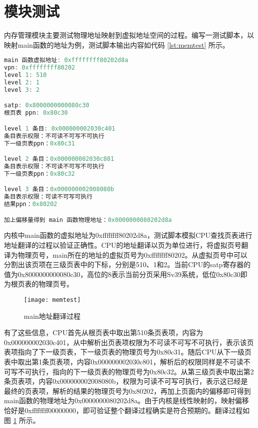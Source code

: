 \section{模块测试}

内存管理模块主要测试物理地址映射到虚拟地址空间的过程。编写一测试脚本，以映射main函数的地址为例，测试脚本输出内容如代码 \ref{lst:memtest} 所示。

\begin{minipage}[c]{0.95\textwidth}
\begin{lstlisting}[language={C}, caption={main函数地址翻译}, label={lst:memtest}]
main 函数虚拟地址: 0xffffffff80202d8a
vpn: 0xffffffff80202
level 1: 510
level 2: 1
level 3: 2

satp: 0x8000000000080c30
根页表 ppn: 0x80c30

level 1 条目: 0x000000002030c401
条目表示权限：不可读不可写不可执行
下一级页表ppn：0x80c31

level 2 条目：0x000000002030c801
条目表示权限：不可读不可写不可执行
下一级页表ppn：0x80c32

level 3 条目：0x000000002008080b
条目表示权限：可读不可写可执行
结果ppn：0x80202

加上偏移量得到 main 函数物理地址：0x0000000080202d8a
\end{lstlisting}
\end{minipage}

内核中main函数的虚拟地址为0xffffffff80202d8a，测试脚本模拟CPU查找页表进行地址翻译的过程以验证正确性。CPU的地址翻译以页为单位进行，将虚拟页号翻译为物理页号，main所在的地址的虚拟页号为0xffffffff80202。从虚拟页号中可以分割出该页项在三级页表中的下标，分别是510、1和2。当前CPU的satp寄存器的值为0x8000000000080c30，高位的8表示当前分页采用Sv39系统，低位0x80c30即为根页表的物理页号。

\begin{figure}[htpb]
	\centering
	\texttt{[image: memtest]}
	\setlength{\abovecaptionskip}{2pt}
	\caption{main地址翻译过程}
	\label{pic:memtest}
\end{figure}

有了这些信息，CPU首先从根页表中取出第510条页表项，内容为0x000000002030c401，从中解析出页表项权限为不可读不可写不可执行，表示该页表项指向了下一级页表，下一级页表的物理页号为0x80c31。随后CPU从下一级页表中取出第1条页表项，内容0x000000002030c801，解析后的权限同样是不可读不可写不可执行，指向的下一级页表的物理页号为0x80c32。从第三级页表中取出第2条页表项，内容0x000000002008080b，权限为可读不可写可执行，表示这已经是最终的页表项，解析的结果的物理页号为0x80202，再加上页面内的偏移即可得到main函数的物理地址为0x0000000080202d8a。由于内核是线性映射的，映射偏移恰好是0xffffffff00000000，即可验证整个翻译过程确实是符合预期的。翻译过程如图 \ref{pic:memtest} 所示。